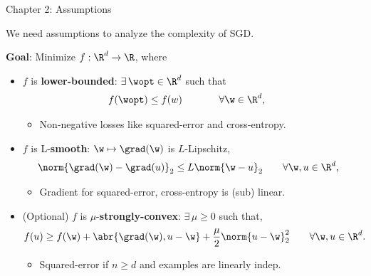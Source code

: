 \documentclass[mathserif,notheorems, hyperref={colorlinks, citecolor=blue, urlcolor=blue, linkcolor=blue}]{beamer}
\begin{document}

    \begin{frame}{Chapter 2: Assumptions}
        \begin{center}
            We need assumptions to analyze the complexity of SGD. 
        \end{center}
       
        \vspace{1.5ex}

        \textbf{Goal}: Minimize \( f : \R^d \rightarrow \R \), where
        \vspace{0.5ex}
        \pause
        \begin{itemize}
            \item \( f \) is \textbf{lower-bounded}: \( \exists \, \wopt \in \R^d \) such that
                \begin{align*}
                    f(\wopt) &\leq f(w) \hspace{1.7em} \tag*{\(\forall \w \in \R^d \), } 
                \end{align*}
                \vspace{-2ex}
                \begin{itemize}
                    \item Non-negative losses like squared-error and cross-entropy. 
                \end{itemize}
                \vspace{1ex}
                \pause 
            \item \( f \) is L-\textbf{smooth}: \( \w \mapsto \grad(\w) \) is \( L \)-Lipschitz, 
                \begin{align*}
                    \norm{\grad(\w) - \grad(u)}_2 &\leq L \norm{\w - u}_2 \tag*{\(\forall \w, u \in \R^d \),} 
                \end{align*}
                \vspace{-2ex}
                \begin{itemize}
                    \item Gradient for squared-error, cross-entropy is (sub) linear. 
                \end{itemize}
                \vspace{1ex}
                \pause
            \item (Optional) \( f \) is \( \mu \)-\textbf{strongly-convex}: \( \exists \, \mu \geq 0 \) such that, 
                \begin{align*}
                   f(u) \geq f(\w) + \abr{\grad(\w), u - \w} + \frac{\mu}{2} \norm{u - \w}^2_2 \tag*{\( \forall \w, u \in \R^d \).}
                \end{align*}
                \vspace{-2ex}
                \begin{itemize}
                    \item Squared-error if \( n \geq d \) and examples are linearly indep. 
                \end{itemize}
        \end{itemize}
     
    \end{frame}
\end{document}
